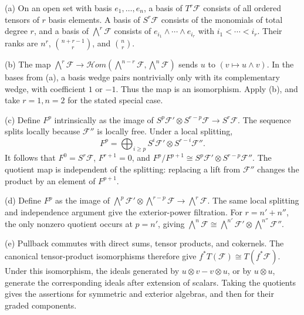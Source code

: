 (a) On an open set with basis $e_1,\ldots,e_n$, a basis of $T^r\mathcal F$ consists of all ordered tensors of $r$ basis elements. A basis of $S^r\mathcal F$ consists of the monomials of total degree $r$, and a basis of $\bigwedge^r\mathcal F$ consists of $e_{i_1}\wedge\cdots\wedge e_{i_r}$ with $i_1<\cdots<i_r$. Their ranks are $n^r$, $\binom{n+r-1}{r}$, and $\binom nr$.

(b) The map $\bigwedge^r\mathcal F\to\mathcal Hom(\bigwedge^{n-r}\mathcal F,\bigwedge^n\mathcal F)$ sends $u$ to $(v\mapsto u\wedge v)$. In the bases from (a), a basis wedge pairs nontrivially only with its complementary wedge, with coefficient $1$ or $-1$. Thus the map is an isomorphism. Apply (b), and take $r=1,n=2$ for the stated special case.

(c) Define $F^p$ intrinsically as the image of $S^p\mathcal F'\otimes S^{r-p}\mathcal F\to S^r\mathcal F$. The sequence splits locally because $\mathcal F''$ is locally free. Under a local splitting,
\[F^p=\bigoplus_{i\ge p}S^i\mathcal F'\otimes S^{r-i}\mathcal F''.\]
It follows that $F^0=S^r\mathcal F$, $F^{r+1}=0$, and $F^p/F^{p+1}\cong S^p\mathcal F'\otimes S^{r-p}\mathcal F''$. The quotient map is independent of the splitting: replacing a lift from $\mathcal F''$ changes the product by an element of $F^{p+1}$.

(d) Define $F^p$ as the image of $\bigwedge^p\mathcal F'\otimes\bigwedge^{r-p}\mathcal F\to\bigwedge^r\mathcal F$. The same local splitting and independence argument give the exterior-power filtration. For $r=n'+n''$, the only nonzero quotient occurs at $p=n'$, giving $\bigwedge^n\mathcal F\cong\bigwedge^{n'}\mathcal F'\otimes\bigwedge^{n''}\mathcal F''$.

(e) Pullback commutes with direct sums, tensor products, and cokernels. The canonical tensor-product isomorphisms therefore give $f^*T(\mathcal F)\cong T(f^*\mathcal F)$. Under this isomorphism, the ideals generated by $u\otimes v-v\otimes u$, or by $u\otimes u$, generate the corresponding ideals after extension of scalars. Taking the quotients gives the assertions for symmetric and exterior algebras, and then for their graded components.
